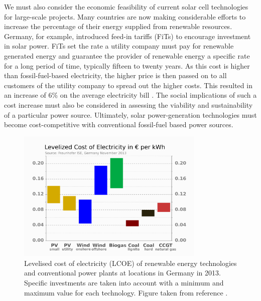 \documentclass[11pt, twoside]{report}
\begin{document}
We must also consider the economic feasibility of current solar cell technologies for large-scale projects.
Many countries are now making considerable efforts to increase the percentage of their energy supplied from renewable resources. Germany, for example, introduced feed-in tariffs (FiTs) to encourage investment in solar power.
FiTs set the rate a utility company must pay for renewable generated energy and guarantee the provider of renewable energy a specific rate for a long period of time, typically fifteen to twenty years. As this cost is higher than fossil-fuel-based electricity, the higher price is then passed on to all customers of the utility company to spread out the higher costs. This resulted in an increase of 6\% on the average electricity bill \cite{Germany_Oregon}. The social implications of such a cost increase must also be considered in assessing the viability and sustainability of a particular power source.
Ultimately, solar power-generation technologies must become cost-competitive with conventional fossil-fuel based power sources.

\begin{figure}[h!]
  \centering
    \includegraphics[width=0.8\textwidth]{figures/LCOE.png}
    \caption{Levelised cost of electricity (LCOE) of renewable energy technologies and conventional power plants at locations in Germany in 2013.  Specific investments are taken into account with a minimum and maximum value for each technology. Figure taken from reference .}
  \label{LCOE}
\end{figure}

\end{document}
